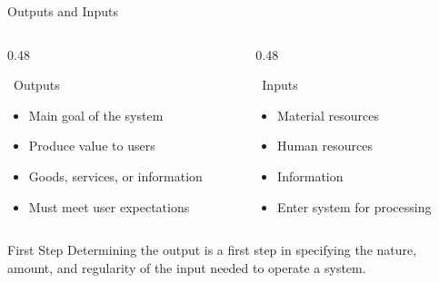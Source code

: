 \documentclass[aspectratio=169]{beamer}
\begin{document}
\begin{frame}{Outputs and Inputs}
    \begin{columns}
        \begin{column}{0.48\textwidth}
            \begin{block}{\faFileExport\, Outputs}
                \begin{itemize}
                    \item Main goal of the system
                    \item Produce value to users
                    \item Goods, services, or information
                    \item Must meet user expectations
                \end{itemize}
            \end{block}
        \end{column}
        \begin{column}{0.48\textwidth}
            \begin{block}{\faFileExport\, Inputs}
                \begin{itemize}
                    \item Material resources
                    \item Human resources
                    \item Information
                    \item Enter system for processing
                \end{itemize}
            \end{block}
        \end{column}
    \end{columns}
    
    \vspace{0.5cm}
    \begin{center}
    \end{center}
    
    \begin{exampleblock}{First Step}
        Determining the output is a first step in specifying the nature, amount, and regularity of the input needed to operate a system.
    \end{exampleblock}
\end{frame}
\end{document}

